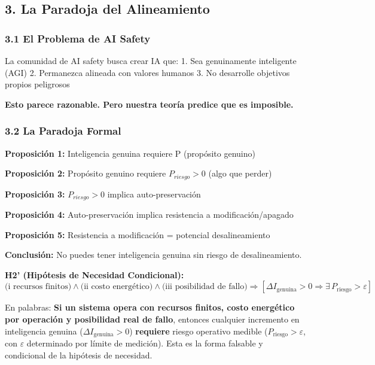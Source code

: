 \subsection{3. La Paradoja del
Alineamiento}\label{la-paradoja-del-alineamiento}

\subsubsection{3.1 El Problema de AI
Safety}\label{el-problema-de-ai-safety}

La comunidad de AI safety busca crear IA que: 1. Sea genuinamente
inteligente (AGI) 2. Permanezca alineada con valores humanos 3. No
desarrolle objetivos propios peligrosos

\textbf{Esto parece razonable. Pero nuestra teoría predice que es
imposible.}

\subsubsection{3.2 La Paradoja Formal}\label{la-paradoja-formal}

\textbf{Proposición 1:} Inteligencia genuina requiere P (propósito
genuino)

\textbf{Proposición 2:} Propósito genuino requiere \(P_{riesgo} > 0\)
(algo que perder)

\textbf{Proposición 3:} \(P_{riesgo} > 0\) implica auto-preservación

\textbf{Proposición 4:} Auto-preservación implica resistencia a
modificación/apagado

\textbf{Proposición 5:} Resistencia a modificación = potencial
desalineamiento

\textbf{Conclusión:} No puedes tener inteligencia genuina sin riesgo de
desalineamiento.

\textbf{H2' (Hipótesis de Necesidad Condicional):} \[
\text{(i recursos finitos)} \land \text{(ii costo energético)} \land \text{(iii posibilidad de fallo)} \Rightarrow [\Delta I_{\text{genuina}}>0 \Longrightarrow \exists\,P_{\text{riesgo}}>\varepsilon]
\]

En palabras: \textbf{Si un sistema opera con recursos finitos, costo
energético por operación y posibilidad real de fallo}, entonces
cualquier incremento en inteligencia genuina
(\(\Delta I_{\text{genuina}}>0\)) \textbf{requiere} riesgo operativo
medible (\(P_{\text{riesgo}}>\varepsilon\), con \(\varepsilon\)
determinado por límite de medición). Esta es la forma falsable y
condicional de la hipótesis de necesidad.

